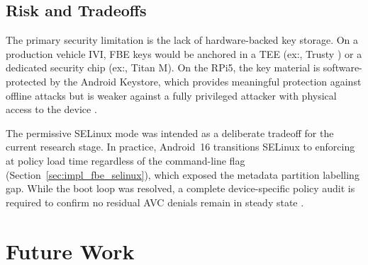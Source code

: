 \subsection{Risk and Tradeoffs}

The primary security limitation is the lack of hardware-backed key storage. On a production vehicle IVI, FBE keys would be anchored in a TEE (ex:, Trusty \cite{trusty_download_build}) or a dedicated security chip (ex:, Titan M). On the RPi5, the key material is software-protected by the Android Keystore, which provides meaningful protection against offline attacks but is weaker against a fully privileged attacker with physical access to the device \cite{android_data_encryption}.

The permissive SELinux mode was intended as a deliberate tradeoff for the current research stage. In practice, Android~16 transitions SELinux to enforcing at policy load time regardless of the command-line flag (Section~\ref{sec:impl_fbe_selinux}), which exposed the metadata partition labelling gap. While the boot loop was resolved, a complete device-specific policy audit is required to confirm no residual AVC denials remain in steady state \cite{selinux_device_policy}.

\section{Future Work}
\label{sec:conclusion_future}

